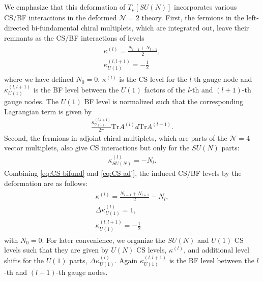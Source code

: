 \documentclass[a4paper,11pt]{article}
\begin{document}
We emphasize that this deformation of $T_\rho [SU(N)]$ incorporates various CS/BF interactions in the deformed $\mathcal N = 2$ theory. First, the fermions in the left-directed bi-fundamental chiral multiplets, which are integrated out, leave their remnants as the CS/BF interactions of levels
\begin{gather}
\begin{gathered}
\label{eq:CS bifund}
\kappa^{(l)} = \frac{N_{l-1}+N_{l+1}}{2}, \\
\kappa_{U(1)}^{(l,l+1)} = -\frac{1}{2}
\end{gathered}
\end{gather}
where we have defined $N_0 = 0$. $\kappa^{(l)}$ is the CS level for the $l$-th gauge node and $\kappa_{U(1)}^{(l,l+1)}$ is the BF level between the $U(1)$ factors of the $l$-th and $(l+1)$-th gauge nodes. The $U(1)$ BF level is normalized such that the corresponding Lagrangian term is given by
\begin{align}
\frac{\kappa_{U(1)}^{(l,l+1)}}{2 \pi} \mathrm{Tr} A^{(l)} d \mathrm{Tr} A^{(l+1)}.
\end{align}
Second, the  fermions in adjoint chiral multiplets, which are parts of the $\mathcal N = 4$ vector multiplets, also give CS interactions but only for the $SU(N)$ parts:
\begin{align}
\label{eq:CS adj}
\kappa^{(l)}_{SU(N)} = -N_l.
\end{align}
Combining \eqref{eq:CS bifund} and \eqref{eq:CS adj}, the induced CS/BF levels by the deformation are as follows:
\begin{gather}
\begin{gathered}
\label{eq:def levels}
\kappa^{(l)} = \frac{N_{l-1}+N_{l+1}}{2}-N_l, \\
\Delta \kappa_{U(1)}^{(l)} = 1, \\
\kappa_{U(1)}^{(l,l+1)} = -\frac{1}{2}
\end{gathered}
\end{gather}
with $N_0 = 0$. For later convenience, we organize the $SU(N)$ and $U(1)$ CS levels such that they are given by $U(N)$ CS levels, $\kappa^{(l)}$, and additional level shifts for the $U(1)$ parts, $\Delta \kappa_{U(1)}^{(l)}$. Again $\kappa_{U(1)}^{(l,l+1)}$ is the BF level between the $l$-th and $(l+1)$-th gauge nodes.
\\
\end{document}
